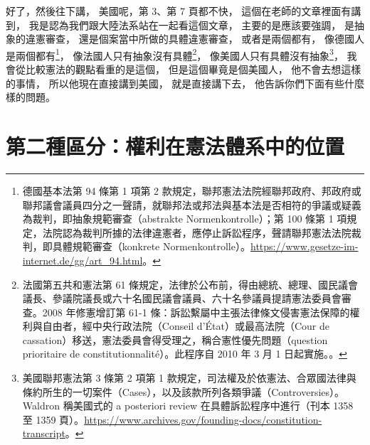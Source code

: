 \hypertarget{w06:cue:995}{}好了，然後往下講，
\hypertarget{w06:cue:996}{}美國呢，第 3、第 7 頁都不快，
\hypertarget{w06:cue:997}{}這個在老師的文章裡面有講到，
\hypertarget{w06:cue:998}{}我是認為我們跟大陸法系站在一起看這個文章，
\hypertarget{w06:cue:999}{}主要的是應該要強調，
\hypertarget{w06:cue:1000}{}是抽象的違憲審查，
\hypertarget{w06:cue:1001}{}還是個案當中所做的具體違憲審查，
\hypertarget{w06:cue:1002}{}或者是兩個都有，
\hypertarget{w06:cue:1003}{}像德國人是兩個都有\footnote{德國基本法第 94 條第 1 項第 2 款規定，聯邦憲法法院經聯邦政府、邦政府或聯邦議會議員四分之一聲請，就聯邦法或邦法與基本法是否相符的爭議或疑義為裁判，即抽象規範審查（abstrakte Normenkontrolle）；第 100 條第 1 項規定，法院認為裁判所據的法律違憲者，應停止訴訟程序，聲請聯邦憲法法院裁判，即具體規範審查（konkrete Normenkontrolle）。\url{https://www.gesetze-im-internet.de/gg/art_94.html}。}，
\hypertarget{w06:cue:1004}{}像法國人只有抽象沒有具體\footnote{法國第五共和憲法第 61 條規定，法律於公布前，得由總統、總理、國民議會議長、參議院議長或六十名國民議會議員、六十名參議員提請憲法委員會審查。2008 年修憲增訂第 61-1 條：訴訟繫屬中主張法律條文侵害憲法保障的權利與自由者，經中央行政法院（Conseil d’État）或最高法院（Cour de cassation）移送，憲法委員會得受理之，稱合憲性優先問題（question prioritaire de constitutionnalité）。此程序自 2010 年 3 月 1 日起實施。\cite{const1958}。}，
\hypertarget{w06:cue:1005}{}像美國人只有具體沒有抽象\footnote{美國聯邦憲法第 3 條第 2 項第 1 款規定，司法權及於依憲法、合眾國法律與條約所生的一切案件（Cases），以及該款所列各類爭議（Controversies）。Waldron 稱美國式的 a posteriori review 在具體訴訟程序中進行（刊本 1358 至 1359 頁）。\url{https://www.archives.gov/founding-docs/constitution-transcript}。}，
\hypertarget{w06:cue:1006}{}我會從比較憲法的觀點看重的是這個，
\hypertarget{w06:cue:1007}{}但是這個畢竟是個美國人，
\hypertarget{w06:cue:1008}{}他不會去想這樣的事情，
\hypertarget{w06:cue:1009}{}所以他現在直接講到美國，
\hypertarget{w06:cue:1010}{}就是直接講下去，
\hypertarget{w06:cue:1011}{}他告訴你們下面有些什麼樣的問題。

\section{第二種區分：權利在憲法體系中的位置}

